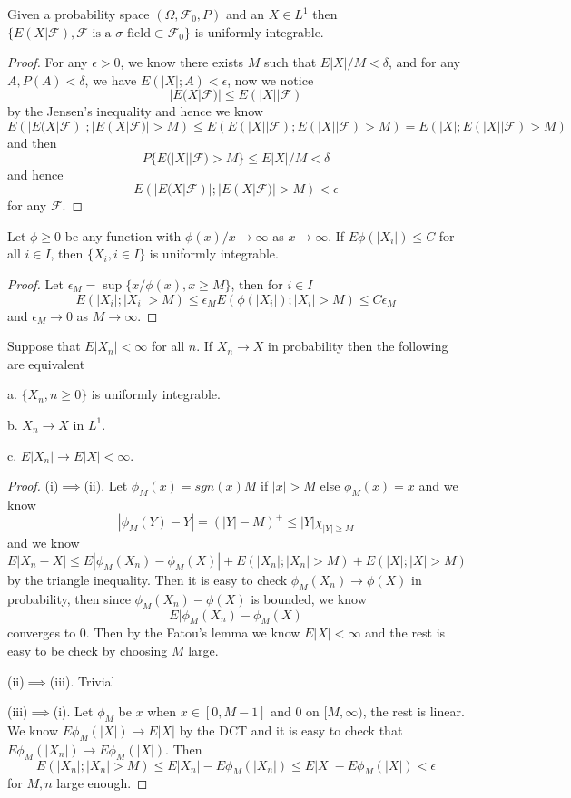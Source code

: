 \documentclass[lang=en, color=blue, ]{elegantbook}
\newcommand{\F}{\mathcal{F}}
\begin{document}
\begin{theorem}
    Given a probability space $(\Omega,\F_0,P)$ and an $X\in L^1$ then $\{E(X|\F), \F\text{ is a }\sigma\text{-field} \subset \F_0\}$ is uniformly integrable.
\end{theorem}
\begin{proof}
    For any $\epsilon > 0$, we know there exists $M$ such that $E|X|/M < \delta$, and for any $A,P(A)<\delta$, we have $E(|X|;A)<\epsilon$, now we notice
    \[
    |E(X|\F)| \leq E(|X||\F)
    \]
    by the Jensen's inequality and hence we know
    \[
    E(|E(X|\F)|;|E(X|\F)| > M) \leq E(E(|X||\F);E(|X||\F) > M) = E(|X|;E(|X||\F) > M)
    \]
    and then
    \[
    P\{E(|X||\F) > M\} \leq E|X|/M < \delta
    \]
    and hence
    \[
    E(|E(X|\F)|;|E(X|\F)| > M) < \epsilon
    \]
    for any $\F$.
\end{proof}

\begin{theorem}
    Let $\phi \geq 0$ be any function with $\phi(x)/x \to \infty$ as $x\to\infty$. If $E\phi(|X_i|) \leq C$ for all $i \in I$, then $\{X_i, i\in I\}$ is uniformly integrable.
\end{theorem}
\begin{proof}
    Let $\epsilon_M = \sup\{x/\phi(x), x\geq M\}$, then for $i\in I$
    \[E(|X_i|;|X_i| > M) \leq \epsilon_M E(\phi(|X_i|); |X_i| > M) \leq C\epsilon_M\]
    and $\epsilon_M \to 0$ as $M\to\infty$.
\end{proof}

\begin{theorem}
    Suppose that $E|X_n| <\infty$ for all $n$. If $X_n\to X$ in probability then the following are equivalent\par
    a. $\{X_n, n\geq 0\}$ is uniformly integrable.\par
    b. $X_n\to X$ in $L^1$.\par
    c. $E|X_n| \to E|X| < \infty$.
\end{theorem}
\begin{proof}
    (i)$\implies$(ii). Let $\phi_M(x) = sgn(x)M$ if $|x|>M$ else $\phi_M(x) = x$ and we know
    \[
    |\phi_M(Y)-Y| = (|Y|-M)^+ \leq |Y|\chi_{|Y|\geq M}
    \]
    and we know
    \[
    E|X_n-X| \leq E|\phi_M(X_n)-\phi_M(X)| + E(|X_n|;|X_n| > M) + E(|X|;|X| > M)
    \]
    by the triangle inequality. Then it is easy to check $\phi_M(X_n) \to \phi(X)$ in probability, then since $\phi_M(X_n)-\phi(X)$ is bounded, we know
    \[E|\phi_M(X_n)-\phi_M(X)\]
    converges to $0$. Then by the Fatou's lemma we know $E|X| < \infty$ and the rest is easy to be check by choosing $M$ large.\par
    (ii)$\implies$(iii). Trivial\par
    (iii)$\implies$(i). Let $\phi_M$ be $x$ when $x \in [0,M-1]$ and $0$ on $[M,\infty)$, the rest is linear. We know $E\phi_M(|X|) \to E|X|$ by the DCT and it is easy to check that $E\phi_M(|X_n|) \to E\phi_M(|X|)$. Then
    \[E(|X_n|; |X_n|>M) \leq E|X_n| - E\phi_M(|X_n|) \leq E|X| - E\phi_M(|X|) < \epsilon\]
    for $M, n$ large enough.
\end{proof}
\end{document}
